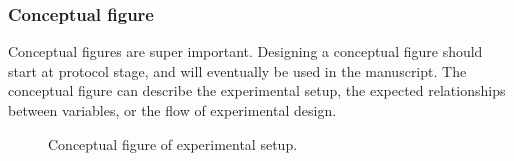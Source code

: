 \documentclass[a4paper,11pt]{article}
\begin{document}
\newpage



\subsubsection*{Conceptual figure}

Conceptual figures are super important. Designing a conceptual figure should start at protocol stage, and will eventually be used in the manuscript. The conceptual figure can describe the experimental setup, the expected relationships between variables, or the flow of experimental design.

\begin{figure}
  \caption{ Conceptual figure of experimental setup.}
  \label{fig:concept}
\end{figure}




\clearpage


\end{document}
